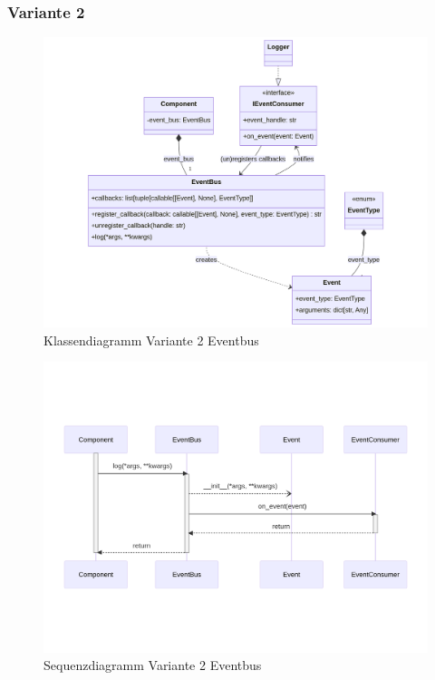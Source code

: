 \subsubsection*{Variante 2}

\begin{figure}[!hb]
	\centering
	\includegraphics[width=0.75\linewidth]{images/diagrams/eventbus-v2-class.png}
	\caption{Klassendiagramm Variante 2 Eventbus}
	\label{fig:eventbus-v2-class}
\end{figure}

\begin{figure}[!hb]
	\centering
	\includegraphics[width=0.75\linewidth]{images/diagrams/eventbus-v2-seq.png}
	\caption{Sequenzdiagramm Variante 2 Eventbus}
	\label{fig:eventbus-v2-seq}
\end{figure}
